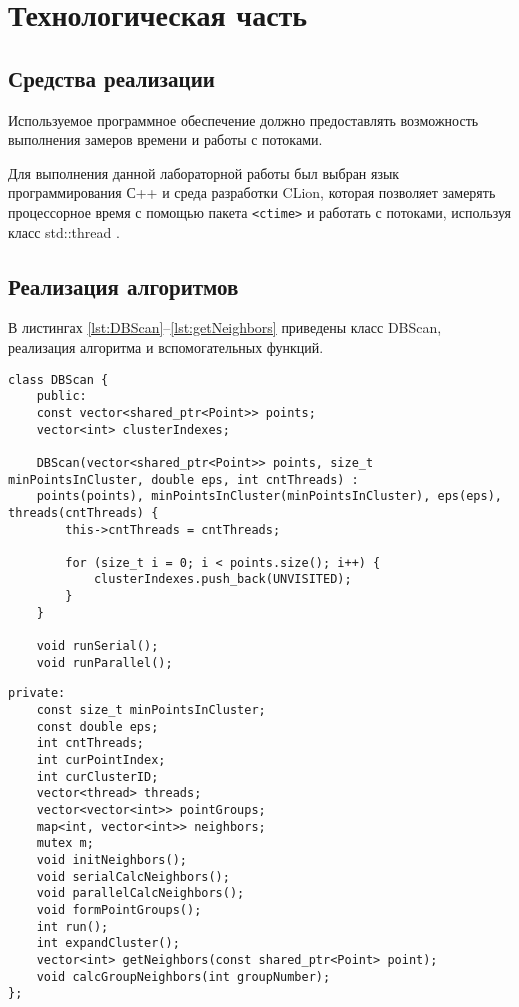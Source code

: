 \chapter{Технологическая часть}

\section{Средства реализации}
Используемое программное обеспечение должно предоставлять возможность выполнения замеров времени и работы с потоками.

Для выполнения данной лабораторной работы был выбран язык программирования С++ \cite{c} и среда разработки CLion, которая позволяет замерять процессорное время с помощью пакета \texttt{<ctime>} \cite{ctime} и работать с потоками, используя класс std::thread \cite{thread}.

\section{Реализация алгоритмов}

В листингах \ref{lst:DBScan}--\ref{lst:getNeighbors} приведены класс DBScan, реализация алгоритма и вспомогательных функций.

\begin{lstlisting}[label=lst:DBScan,caption=Классс DBScan (часть 1)]
class DBScan {
	public:
	const vector<shared_ptr<Point>> points;
	vector<int> clusterIndexes;
	
	DBScan(vector<shared_ptr<Point>> points, size_t minPointsInCluster, double eps, int cntThreads) :
	points(points), minPointsInCluster(minPointsInCluster), eps(eps), threads(cntThreads) {
		this->cntThreads = cntThreads;
		
		for (size_t i = 0; i < points.size(); i++) {
			clusterIndexes.push_back(UNVISITED);
		}
	} 
	
	void runSerial();
	void runParallel();
\end{lstlisting}

\begin{lstlisting}[label=lst:DBScan2,caption=Классс DBScan (часть 2)]
private:
	const size_t minPointsInCluster;
	const double eps;
	int cntThreads;
	int curPointIndex;
	int curClusterID;
	vector<thread> threads;
	vector<vector<int>> pointGroups;
	map<int, vector<int>> neighbors;
	mutex m;
	void initNeighbors();
	void serialCalcNeighbors();
	void parallelCalcNeighbors();
	void formPointGroups();	
	int run();
	int expandCluster();
	vector<int> getNeighbors(const shared_ptr<Point> point);
	void calcGroupNeighbors(int groupNumber);
};
\end{lstlisting}


